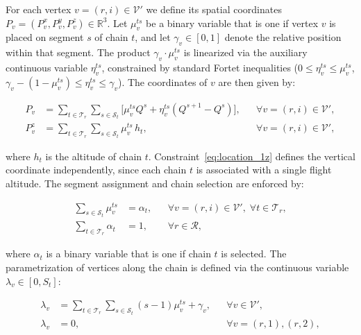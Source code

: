 \documentclass[12pt]{elsarticle}
\begin{document}
For each vertex $v=(r,i)\in\mathcal V'$ we define its spatial coordinates $P_v=(P_v^x,P_v^y,P_v^z)\in\mathbb R^3$. Let $\mu_v^{ts}$ be a binary variable that is one if vertex $v$ is placed on segment $s$ of chain $t$, and let $\gamma_v\in[0,1]$ denote the relative position within that segment. The product $\gamma_v\cdot\mu_v^{ts}$ is linearized via the auxiliary continuous variable $\eta_v^{ts}$, constrained by standard Fortet inequalities ($0\le\eta_v^{ts}\le\mu_v^{ts}$, $\gamma_v-(1-\mu_v^{ts})\le\eta_v^{ts}\le\gamma_v$). The coordinates of $v$ are then given by:

\begin{align}
    P_v &= \sum_{t\in\mathcal T_r}\sum_{s\in\mathcal S_t}
          \bigl[ \mu_v^{ts} Q^s + \eta_v^{ts} (Q^{s+1}-Q^s) \bigr],
          && \forall v=(r,i)\in\mathcal V', \label{eq:location_1}\tag{Loc-C$_1$}\\[2mm]
    P_v^z &= \sum_{t\in\mathcal T_r}\sum_{s\in\mathcal S_t}
            \mu_v^{ts}\,h_t,
          && \forall v=(r,i)\in\mathcal V', \label{eq:location_1z}\tag{Loc-C$_1^z$}
\end{align}

\noindent where $h_t$ is the altitude of chain $t$. Constraint~\eqref{eq:location_1z} defines the vertical coordinate independently, since each chain $t$ is associated with a single flight altitude. The segment assignment and chain selection are enforced by:

\begin{align}
    \sum_{s\in\mathcal S_t} \mu_v^{ts} &= \alpha_t,
          && \forall v=(r,i)\in\mathcal V',\; \forall t\in\mathcal T_r,
          \label{eq:location_2}\tag{Loc-C$_2$}\\
    \sum_{t\in\mathcal T_r} \alpha_t &= 1,
          && \forall r\in\mathcal R,
          \label{eq:location_3}\tag{Loc-C$_3$}
\end{align}

\noindent where $\alpha_t$ is a binary variable that is one if chain $t$ is selected. The parametrization of vertices along the chain is defined via the continuous variable $\lambda_v\in[0,S_t]$:

\begin{align}
    \lambda_v &= \sum_{t\in\mathcal T_r}\sum_{s\in\mathcal S_t}
                (s-1)\mu_v^{ts} + \gamma_v,
          && \forall v\in\mathcal V',
          \label{eq:location_4}\tag{Loc-C$_4$}\\
    \lambda_v &= 0,
          && \forall v=(r,1),(r,2),
          \label{eq:location_5}\tag{Loc-C$_5$}
\end{align}
\end{document}
